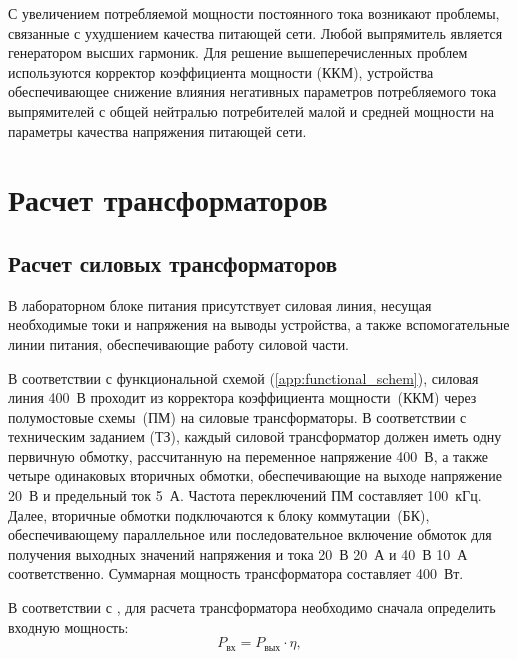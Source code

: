 \documentclass[utf8x, 14pt, oneside, a4paper]{article}
\begin{document}
	С увеличением потребляемой мощности постоянного тока возникают проблемы, связанные с ухудшением качества питающей сети. Любой выпрямитель является генератором высших гармоник. Для решение вышеперечисленных проблем используются корректор коэффициента мощности (ККМ), устройства обеспечивающее снижение влияния негативных параметров потребляемого
	тока выпрямителей с общей нейтралью потребителей малой и средней мощности на параметры качества напряжения питающей сети.
	
	\pagebreak
	
	
	\titleformat{\section}[block]
	{\normalsize\bfseries}{\thesection}{1em}{}
	
	\section{Расчет трансформаторов}
	
		\subsection{Расчет силовых трансформаторов}
		В лабораторном блоке питания присутствует силовая линия, несущая необходимые токи и напряжения на выводы устройства, а также вспомогательные линии питания, обеспечивающие работу силовой части.
		
		В соответствии с функциональной схемой (\ref{app:functional_schem}), силовая линия 400~В проходит из корректора коэффициента мощности~(ККМ) через полумостовые схемы~(ПМ) на силовые трансформаторы. В соответствии с техническим заданием (ТЗ), каждый силовой трансформатор должен иметь одну первичную обмотку, рассчитанную на переменное напряжение 400~В, а также четыре одинаковых вторичных обмотки, обеспечивающие на выходе напряжение 20~В и предельный ток 5~А. Частота переключений ПМ составляет 100~кГц. Далее, вторичные обмотки подключаются к блоку коммутации~(БК), обеспечивающему параллельное или последовательное включение обмоток для получения выходных значений напряжения и тока 20~В 20~А и 40~В 10~А соответственно. Суммарная мощность трансформатора составляет 400~Вт.
		
		В соответствии с \cite{bib:kostikov}, для расчета трансформатора необходимо сначала определить входную мощность:
		\begin{equation}
			P_{\text{вх}}=P_{\text{вых}}\cdot\eta,
		\end{equation}
	
\end{document}
